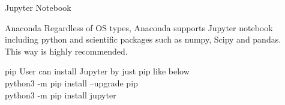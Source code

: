 \begin{frame}{Jupyter Notebook}
\begin{block}{Anaconda}
Regardless of OS types, Anaconda supports Jupyter notebook including python and scientific packages such as numpy, Scipy and pandas. \\ This way is highly recommended.
\end{block}

\begin{block}{pip}
User can install Jupyter by just pip like below \\
python3 -m pip install --upgrade pip \\
python3 -m pip install jupyter
\end{block}

\end{frame}